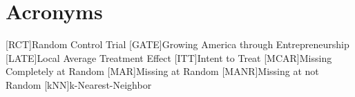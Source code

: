 
\section*{Acronyms}
\begin{acronym}
	[RCT]{Random Control Trial}
	[GATE]{Growing America through Entrepreneurship}
      	[LATE]{Local Average Treatment Effect}
	[ITT]{Intent to Treat}
	[MCAR]{Missing Completely at Random}
	[MAR]{Missing at Random}
	[MANR]{Missing at not Random}
	[kNN]{k-Nearest-Neighbor}
\end{acronym}
